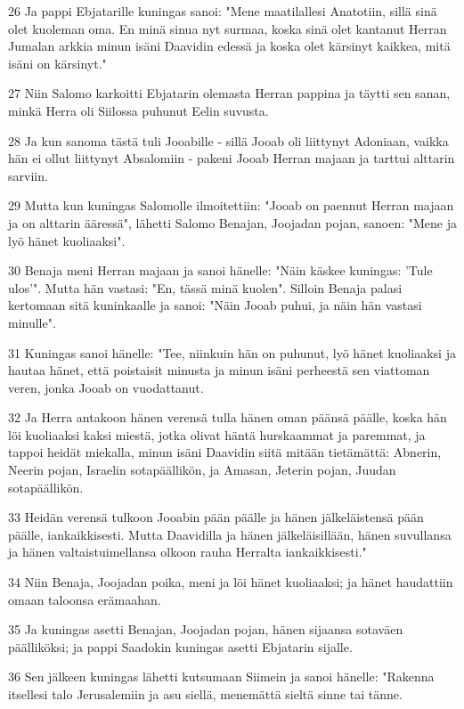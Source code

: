 \par 26 Ja pappi Ebjatarille kuningas sanoi: "Mene maatilallesi Anatotiin, sillä sinä olet kuoleman oma. En minä sinua nyt surmaa, koska sinä olet kantanut Herran Jumalan arkkia minun isäni Daavidin edessä ja koska olet kärsinyt kaikkea, mitä isäni on kärsinyt."
\par 27 Niin Salomo karkoitti Ebjatarin olemasta Herran pappina ja täytti sen sanan, minkä Herra oli Siilossa puhunut Eelin suvusta.
\par 28 Ja kun sanoma tästä tuli Jooabille - sillä Jooab oli liittynyt Adoniaan, vaikka hän ei ollut liittynyt Absalomiin - pakeni Jooab Herran majaan ja tarttui alttarin sarviin.
\par 29 Mutta kun kuningas Salomolle ilmoitettiin: "Jooab on paennut Herran majaan ja on alttarin ääressä", lähetti Salomo Benajan, Joojadan pojan, sanoen: "Mene ja lyö hänet kuoliaaksi".
\par 30 Benaja meni Herran majaan ja sanoi hänelle: "Näin käskee kuningas: 'Tule ulos'". Mutta hän vastasi: "En, tässä minä kuolen". Silloin Benaja palasi kertomaan sitä kuninkaalle ja sanoi: "Näin Jooab puhui, ja näin hän vastasi minulle".
\par 31 Kuningas sanoi hänelle: "Tee, niinkuin hän on puhunut, lyö hänet kuoliaaksi ja hautaa hänet, että poistaisit minusta ja minun isäni perheestä sen viattoman veren, jonka Jooab on vuodattanut.
\par 32 Ja Herra antakoon hänen verensä tulla hänen oman päänsä päälle, koska hän löi kuoliaaksi kaksi miestä, jotka olivat häntä hurskaammat ja paremmat, ja tappoi heidät miekalla, minun isäni Daavidin siitä mitään tietämättä: Abnerin, Neerin pojan, Israelin sotapäällikön, ja Amasan, Jeterin pojan, Juudan sotapäällikön.
\par 33 Heidän verensä tulkoon Jooabin pään päälle ja hänen jälkeläistensä pään päälle, iankaikkisesti. Mutta Daavidilla ja hänen jälkeläisillään, hänen suvullansa ja hänen valtaistuimellansa olkoon rauha Herralta iankaikkisesti."
\par 34 Niin Benaja, Joojadan poika, meni ja löi hänet kuoliaaksi; ja hänet haudattiin omaan taloonsa erämaahan.
\par 35 Ja kuningas asetti Benajan, Joojadan pojan, hänen sijaansa sotaväen päälliköksi; ja pappi Saadokin kuningas asetti Ebjatarin sijalle.
\par 36 Sen jälkeen kuningas lähetti kutsumaan Siimein ja sanoi hänelle: "Rakenna itsellesi talo Jerusalemiin ja asu siellä, menemättä sieltä sinne tai tänne.
